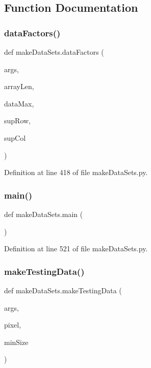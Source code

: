 \subsection{Function Documentation}
\mbox{\label{namespacemake_data_sets_a7bcc7eca6ef7f36c2c379d46ab0ca1bf}} 
\subsubsection{data\+Factors()}
{\footnotesize\ttfamily def make\+Data\+Sets.\+data\+Factors (\begin{DoxyParamCaption}\item[{}]{args,  }\item[{}]{array\+Len,  }\item[{}]{data\+Max,  }\item[{}]{sup\+Row,  }\item[{}]{sup\+Col }\end{DoxyParamCaption})}



Definition at line 418 of file make\+Data\+Sets.\+py.

\mbox{\label{namespacemake_data_sets_a60ec2b793501c029628547aa41d42a89}} 
\subsubsection{main()}
{\footnotesize\ttfamily def make\+Data\+Sets.\+main (\begin{DoxyParamCaption}{ }\end{DoxyParamCaption})}



Definition at line 521 of file make\+Data\+Sets.\+py.

\mbox{\label{namespacemake_data_sets_a98db5601896dcdbb11b9d33a7fef773e}} 
\subsubsection{make\+Testing\+Data()}
{\footnotesize\ttfamily def make\+Data\+Sets.\+make\+Testing\+Data (\begin{DoxyParamCaption}\item[{}]{args,  }\item[{}]{pixel,  }\item[{}]{min\+Size }\end{DoxyParamCaption})}



